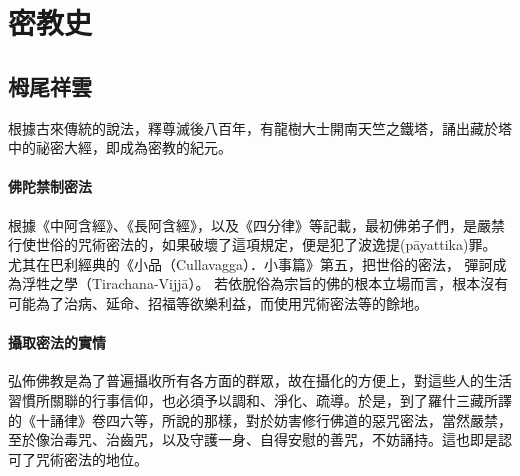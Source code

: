 \section{密教史}

\subsection{栂尾祥雲}

根據古來傳統的說法，釋尊滅後八百年，有龍樹大士開南天竺之鐵塔，誦出藏於塔中的祕密大經，即成為密教的紀元。

\paragraph{佛陀禁制密法}
根據《中阿含經》、《長阿含經》，以及《四分律》等記載，最初佛弟子們，是嚴禁行使世俗的咒術密法的，如果破壞了這項規定，便是犯了波逸提(pāyattika)罪。
尤其在巴利經典的《小品（Cullavagga）．小事篇》第五，把世俗的密法， 彈訶成為浮牲之學（Tirachana-Vijjā）。
若依脫俗為宗旨的佛的根本立場而言，根本沒有可能為了治病、延命、招福等欲樂利益，而使用咒術密法等的餘地。

\paragraph{攝取密法的實情}
弘佈佛教是為了普遍攝收所有各方面的群眾，故在攝化的方便上，對這些人的生活習慣所關聯的行事信仰，也必須予以調和、淨化、疏導。於是，到了羅什三藏所譯的《十誦律》卷四六等，所說的那樣，對於妨害修行佛道的惡咒密法，當然嚴禁，至於像治毒咒、治齒咒，以及守護一身、自得安慰的善咒，不妨誦持。這也即是認可了咒術密法的地位。
